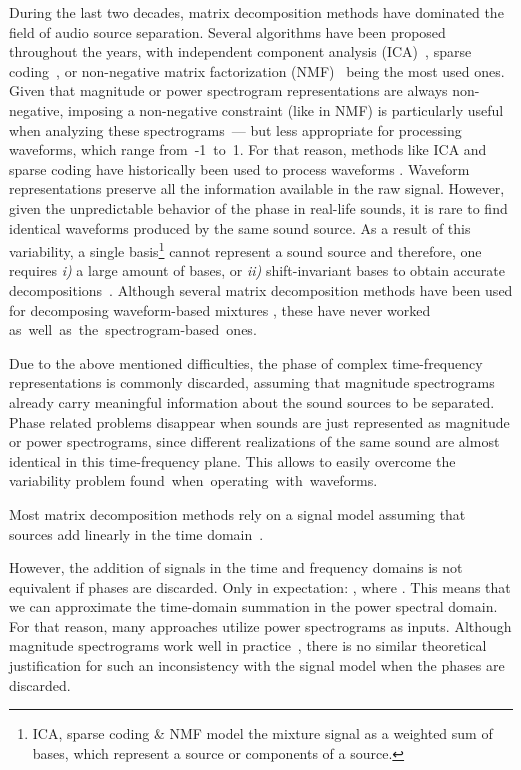 \documentclass[a4paper]{article}
\begin{document}
During the last two decades, matrix decomposition methods have dominated the field of audio source separation.
Several algorithms have been proposed throughout the years, with independent component analysis (ICA)~\cite{hyvarinen2000independent}, sparse coding~\cite{olshausen1997sparse}, or non-negative matrix factorization (NMF)~\cite{lee2001algorithms} being the most used ones. 
Given that magnitude or power spectrogram representations are always non-negative, imposing a non-negative constraint (like in NMF) is particularly useful when analyzing these spectrograms~--- but less appropriate for processing waveforms, which range from~\mbox{-1}~to~1. For that reason, methods like ICA and sparse coding have historically been used to process waveforms \cite{dubnov2002extracting,blumensath2004unsupervised,jang2003maximum}.
Waveform representations preserve all the information available in the raw signal. However, given the unpredictable behavior of the phase in real-life sounds, it is rare to find identical waveforms produced by the same sound source. As a result of this variability, a single basis\footnote{ICA, sparse coding \& NMF model the mixture signal as a weighted sum of bases, which represent a source or components of a source.} cannot represent a sound source and therefore, one requires \textit{i)} a large amount of bases, or \textit{ii)} shift-invariant bases to obtain accurate decompositions~\cite{blumensath2004unsupervised,virtanen2006unsupervised}. 
Although several matrix decomposition methods have been used for decomposing waveform-based mixtures \cite{dubnov2002extracting,blumensath2004unsupervised,jang2003maximum}, these have never worked \mbox{as well as the spectrogram-based~ones.}

Due to the above mentioned difficulties, the phase of complex time-frequency representations is commonly discarded, assuming that magnitude spectrograms already carry meaningful information about the sound sources to be separated.
Phase related problems disappear when sounds are just represented as magnitude or power spectrograms, since different realizations of the same sound are almost identical in this time-frequency plane.
This allows to easily overcome the variability problem \mbox{found when operating with waveforms.}

Most matrix decomposition methods rely on a signal model assuming that sources add linearly in the time domain~\cite{virtanen2006unsupervised}. 

However, the addition of signals in the time and frequency domains is not equivalent if phases are discarded.
Only in expectation: , where . This means that we can approximate the time-domain summation in the power spectral domain.
For that reason, many approaches utilize power spectrograms as inputs. Although magnitude spectrograms work well in practice~\cite{roebel2015automatic}, there is no similar theoretical justification for such an inconsistency with the signal model when the phases are discarded.
\end{document}
